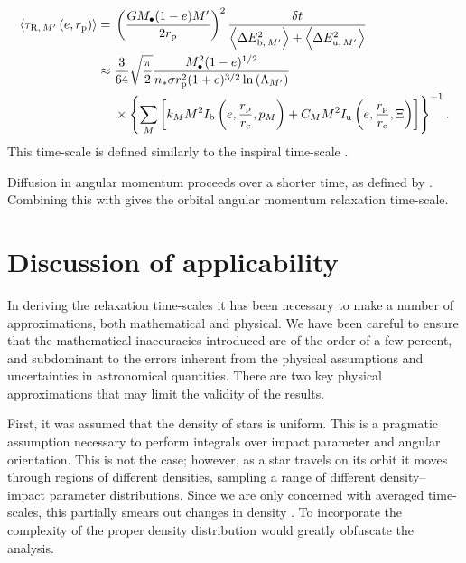 \begin{align}
\left\langle\tau_{\mathrm{R},\,M'}\left(e,r_\mathrm{p}\right)\right\rangle = {} & \left(\dfrac{GM_\bullet(1 - e)M'}{2r_\mathrm{p}}\right)^2\dfrac{\delta t}{\left\langle\Delta E^2_{\mathrm{b},\,M'}\right\rangle + \left\langle\Delta E^2_{\mathrm{u},\,M'}\right\rangle} \\
 \approx {} & \dfrac{3}{64}\sqrt{\dfrac{\pi}{2}} \dfrac{M_\bullet^2(1 - e)^{1/2}}{n_\ast \sigma r_\mathrm{p}^2(1 + e)^{3/2}\ln\left(\Lambda_{M'}\right)} \nonumber \\*
 {} & \times \left\{\sum_M \left[ k_M M^2 I_\mathrm{b}\left(e,\dfrac{r_\mathrm{p}}{r_\mathrm{c}},p_M\right) + C_M M^2 I_\mathrm{u}\left(e,\dfrac{r_\mathrm{p}}{r_\mathrm{c}},\Xi\right)\right]\right\}^{-1}.
\label{eq:orbital-relax}
\end{align}
This time-scale is defined similarly to the inspiral time-scale .

Diffusion in angular momentum proceeds over a shorter time, as defined by . Combining this with  gives the orbital angular momentum relaxation time-scale.

\section{Discussion of applicability}

In deriving the relaxation time-scales it has been necessary to make a number of approximations, both mathematical and physical. We have been careful to ensure that the mathematical inaccuracies introduced are of the order of a few percent, and subdominant to the errors inherent from the physical assumptions and uncertainties in astronomical quantities. There are two key physical approximations that may limit the validity of the results.

First, it was assumed that the density of stars is uniform. This is a pragmatic assumption necessary to perform integrals over impact parameter and angular orientation. This is not the case; however, as a star travels on its orbit it moves through regions of different densities, sampling a range of different density--impact parameter distributions. Since we are only concerned with averaged time-scales, this partially smears out changes in density \citep[cf.][]{Just2011}. To incorporate the complexity of the proper density distribution would greatly obfuscate the analysis.

